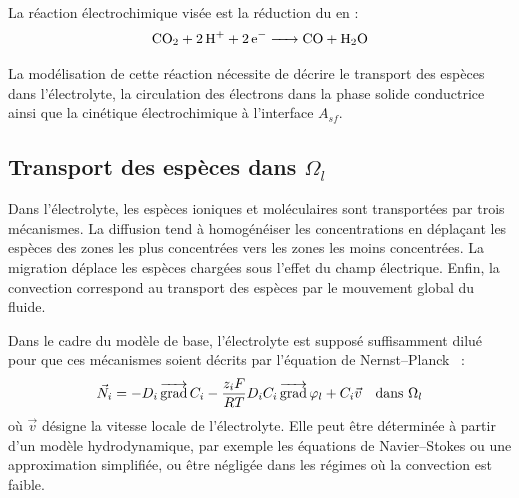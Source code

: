 La réaction électrochimique visée est la réduction du  en  :
\begin{equation}
    \ce{CO2 + 2H+ + 2e- -> CO + H2O}
\end{equation}

La modélisation de cette réaction nécessite de décrire le transport des
espèces dans l'électrolyte, la circulation des électrons dans la phase
solide conductrice ainsi que la cinétique électrochimique à l'interface
$A_{sf}$. %


\newpage
\subsection*{Transport des espèces dans $\Omega_l$}

Dans l'électrolyte, les espèces ioniques et moléculaires sont transportées
par trois mécanismes. La diffusion tend à homogénéiser les concentrations en
déplaçant les espèces des zones les plus concentrées vers les zones les moins
concentrées. La migration déplace les espèces chargées sous l'effet du champ
électrique. Enfin, la convection correspond au transport des espèces par le
mouvement global du fluide.

Dans le cadre du modèle de base, l'électrolyte est supposé suffisamment
dilué pour que ces mécanismes soient décrits par l'équation de Nernst--Planck~\cite{newmanElectrochemicalSystems} :
\begin{equation}
\vec{N}_i = -D_i \mathop{\overrightarrow{\operatorname{grad}}}\nolimits C_i - \frac{z_i F}{RT} D_i C_i \mathop{\overrightarrow{\operatorname{grad}}}\nolimits \varphi_l + C_i \vec{v} \quad \text{dans } \Omega_l
\label{eq:nernst-planck}
\end{equation}
où $\vec{v}$ désigne la vitesse locale de l'électrolyte. Elle peut être
déterminée à partir d'un modèle hydrodynamique, par exemple les équations de
Navier--Stokes ou une approximation simplifiée, ou être négligée dans les
régimes où la convection est faible.

